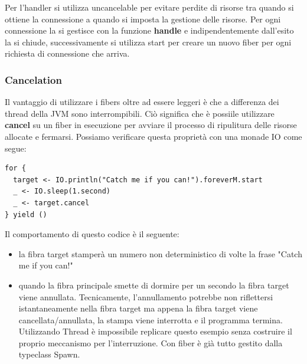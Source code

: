 Per l’handler si utilizza uncancelable per evitare perdite di risorse tra quando si ottiene la connessione a quando si imposta la gestione delle risorse. Per ogni connessione
la si gestisce con la funzione \textbf{handle} e indipendentemente dall’esito la si chiude, successivamente si utilizza start per creare un nuovo fiber per ogni richiesta di connessione che arriva.

\subsubsection{Cancelation}
Il vantaggio di utilizzare i fibers oltre ad essere leggeri è che a differenza dei thread della JVM sono interrompibili. Ciò significa che è possiile utilizzare \textbf{cancel} su un fiber in esecuzione per avviare il processo di ripulitura delle risorse allocate e fermarsi. Possiamo verificare questa proprietà con una monade IO come segue:
\begin{verbatim}
for {
  target <- IO.println("Catch me if you can!").foreverM.start
  _ <- IO.sleep(1.second)
  _ <- target.cancel
} yield ()
\end{verbatim}

Il comportamento di questo codice è il seguente: 
\begin{itemize}
    \item la fibra target stamperà un numero non deterministico di volte la frase "Catch me if you can!"
    \item quando la fibra principale smette di dormire per un secondo la fibra target viene annullata. Tecnicamente, l'annullamento potrebbe non riflettersi istantaneamente nella fibra target ma appena la fibra target viene cancellata/annullata, la stampa viene interrotta e il programma termina. Utilizzando Thread è impossibile replicare questo esempio senza costruire il proprio meccanismo per l’interruzione. Con fiber è già tutto gestito dalla typeclass Spawn.

\end{itemize}

